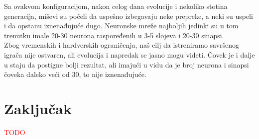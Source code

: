\documentclass[a4paper]{article}
\begin{document}
Sa ovakvom konfiguracijom, nakon celog dana evolucije i nekoliko stotina generacija, miševi su počeli da uspešno izbegavaju neke prepreke, a neki su uspeli i da opstanu iznenađujuće dugo. Neuronske mreže najboljih jedinki su u tom trenutku imale 20-30 neurona raspoređenih u 3-5 slojeva i 20-30 sinapsi. \\

Zbog vremenskih i hardverskih ograničenja, naš cilj da istreniramo savršenog igrača nije ostvaren, ali evolucija i napredak se jasno mogu videti. Čovek je i dalje u staju da postigne bolji rezultat, ali imajući u vidu da je broj neurona i sinapsi čoveka daleko veći od 30, to nije iznenađujuće.


\section{Zaključak}
\label{sec:zakljucak}

\textcolor{red}{TODO}

\pagebreak

\appendix
 

\end{document}
